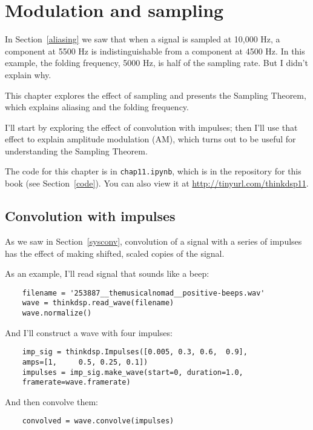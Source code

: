 \chapter{Modulation and sampling}

In Section~\ref{aliasing} we saw that when a signal is sampled at
10,000 Hz, a component at 5500 Hz is indistinguishable from a
component at 4500 Hz.  In this example, the folding frequency, 5000 Hz,
is half of the sampling rate.  But I didn't explain why.

This chapter explores the effect of sampling and presents the
Sampling Theorem, which explains aliasing and the folding frequency.

I'll start by exploring the effect of convolution with impulses;
then I'll use that effect to explain amplitude modulation (AM), which
turns out to be useful for understanding the Sampling Theorem.

The code for this chapter is in {\tt chap11.ipynb}, which is in the
repository for this book (see Section~\ref{code}).
You can also view it at \url{http://tinyurl.com/thinkdsp11}.


\section{Convolution with impulses}

As we saw in Section~\ref{sysconv}, convolution of a signal with
a series of impulses has the effect of making shifted, scaled
copies of the signal.

As an example, I'll read signal that sounds like a beep:

\begin{verbatim}
	filename = '253887__themusicalnomad__positive-beeps.wav'
	wave = thinkdsp.read_wave(filename)
	wave.normalize()
\end{verbatim}

And I'll construct a wave with four impulses:

\begin{verbatim}
	imp_sig = thinkdsp.Impulses([0.005, 0.3, 0.6,  0.9],
	amps=[1,     0.5, 0.25, 0.1])
	impulses = imp_sig.make_wave(start=0, duration=1.0,
	framerate=wave.framerate)
\end{verbatim}

And then convolve them:

\begin{verbatim}
	convolved = wave.convolve(impulses)
\end{verbatim}

